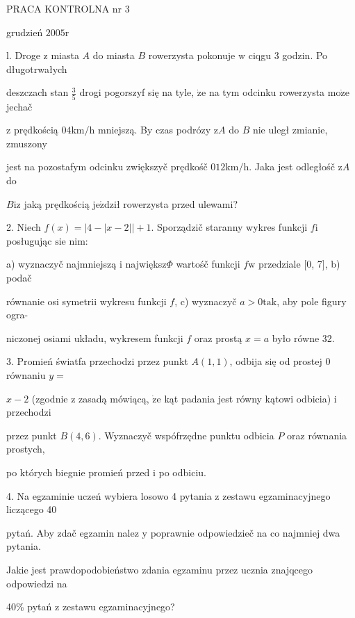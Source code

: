 \documentclass[a4paper,12pt]{article}
\begin{document}
PRACA KONTROLNA nr 3

grudzień $2005\mathrm{r}$

l. Droge $\mathrm{z}$ miasta $A$ do miasta $B$ rowerzysta pokonuje $\mathrm{w}$ ciqgu 3 godzin. Po długotrwałych

deszczach stan $\displaystyle \frac{3}{5}$ drogi pogorszyf się na tyle, $\dot{\mathrm{z}}\mathrm{e}$ na tym odcinku rowerzysta $\mathrm{m}\mathrm{o}\dot{\mathrm{z}}\mathrm{e}$ jechač

$\mathrm{z}$ prędkością $04\mathrm{k}\mathrm{m}/\mathrm{h}$ mniejszą. By czas podrózy $\mathrm{z}A$ do $B$ nie uległ zmianie, zmuszony

jest na pozostafym odcinku zwiększyč prędkośč $012\mathrm{k}\mathrm{m}/\mathrm{h}$. Jaka jest odległośč $\mathrm{z}A$ do

$B\mathrm{i}\mathrm{z}$ jaką prędkością $\mathrm{j}\mathrm{e}\acute{\mathrm{z}}$dził rowerzysta przed ulewami?

2. Niech $f(x)=|4-|x-2||+1$. Sporządzič staranny wykres funkcji $f\mathrm{i}$ posługując $\mathrm{s}\mathrm{i}\mathrm{e}$ nim:

a) wyznaczyč najmniejszą $\mathrm{i}$ największ$\Phi$ wartośč funkcji $f\mathrm{w}$ przedziale $[0$, 7$]$, b) podač

równanie osi symetrii wykresu funkcji $f$, c) wyznaczyč $a>0\mathrm{t}\mathrm{a}\mathrm{k}$, aby pole figury ogra-

niczonej osiami układu, wykresem funkcji $f$ oraz prostą $x=a$ było równe 32.

3. Promień światfa przechodzi przez punkt $A(1,1)$, odbija się od prostej $0$ równaniu $y=$

$x-2$ (zgodnie $\mathrm{z}$ zasadą mówiącą, $\dot{\mathrm{z}}\mathrm{e}$ kąt padania jest równy kątowi odbicia) $\mathrm{i}$ przechodzi

przez punkt $B(4,6)$. Wyznaczyč wspófrzędne punktu odbicia $P$ oraz równania prostych,

po których biegnie promień przed $\mathrm{i}$ po odbiciu.

4. Na egzaminie uczeń wybiera losowo 4 pytania $\mathrm{z}$ zestawu egzaminacyjnego liczącego 40

pytań. Aby zdač egzamin nalez $\mathrm{y}$ poprawnie odpowiedzieč na co najmniej dwa pytania.

Jakie jest prawdopodobieństwo zdania egzaminu przez ucznia znajqcego odpowiedzi na

40\% pytań $\mathrm{z}$ zestawu egzaminacyjnego?
\end{document}
